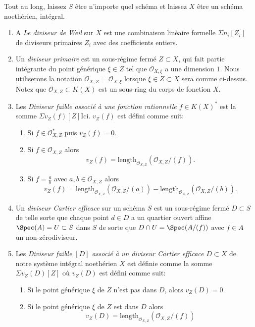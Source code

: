 \begin{definition}
\label{definition-divisor}
Tout au long, laissez $S$ être n'importe quel schéma
et laissez $X$ être un schéma noethérien, intégral.
\begin{enumerate}
\item A {\it Le diviseur de Weil} sur $X$ est une combinaison
linéaire formelle $\Sigma n_i[Z_i]$ de diviseurs primaires $Z_i$ avec des coefficients entiers.
\item Un {\it diviseur primaire} est un sous-régime fermé $Z \subset X$,
qui fait partie intégrante du point générique $\xi \in Z$
tel que ${\mathcal O}_{X, \xi}$ a une dimension $1$. Nous utiliserons la notation
${\mathcal O}_{X, Z} = {\mathcal O}_{X, \xi}$ lorsque
$\xi \in Z \subset X$ sera comme ci-dessus. Notez que ${\mathcal O}_{X, Z} \subset
K(X)$ est un sous-ring du corps de fonction $X$.
\item Les {\it Diviseur faible associé à une fonction rationnelle
$f \in K(X)^\ast$} est la somme $\Sigma v_Z(f)[Z]$Ici. $v_Z(f)$ est
défini comme suit:
\begin{enumerate}
\item Si $f \in {\mathcal O}_{X, Z}^\ast$ puis $v_Z(f) = 0$.
\item Si $f \in {\mathcal O}_{X, Z}$ alors
$$
v_Z(f) = \text{length}_{{\mathcal O}_{X, Z}}({\mathcal O}_{X, Z}/(f)).
$$
\item Si $f = \frac{a}{b}$ avec $a, b \in {\mathcal O}_{X, Z}$
alors
$$
v_Z(f) = \text{length}_{{\mathcal O}_{X, Z}}({\mathcal O}_{X, Z}/(a)) -
\text{length}_{{\mathcal O}_{X, Z}}({\mathcal O}_{X, Z}/(b)).
$$
\end{enumerate}
\item Un {\it diviseur Cartier efficace} sur un schéma $S$ est
un sous-régime fermé $D \subset S$ de telle sorte que chaque point $d\in D$
a un quartier ouvert affine $\Spec(A) = U \subset S$ dans $S$ de
sorte que $D \cap U = \Spec(A/(f))$ avec $f \in A$ un non-zérodiviseur.
\item Les {\it Diviseur faible $[D]$ associé à un diviseur
Cartier efficace $D \subset X$} de notre système intégral noethérien
$X$ est définie comme la somme $\Sigma v_Z(D)[Z]$ où
$v_Z(D)$ est défini comme suit:
\begin{enumerate}
\item Si le point générique $\xi$ de $Z$ n'est pas dans $D$,
alors $v_Z(D) = 0$.
\item Si le point générique $\xi$ de $Z$ est dans $D$
alors
$$
v_Z(D) = \text{length}_{{\mathcal O}_{X, Z}}({\mathcal O}_{X, Z}/(f))
$$
\end{enumerate}
\end{enumerate}
\end{definition}

